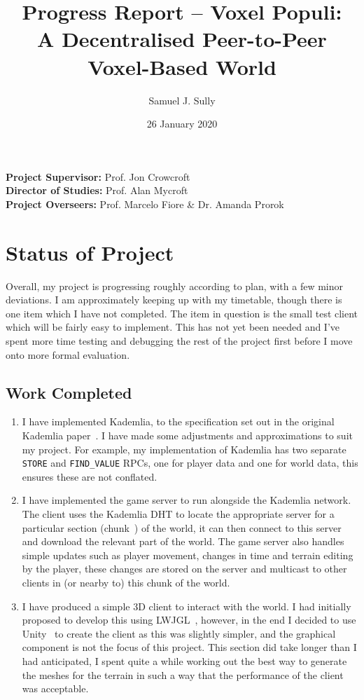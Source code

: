 \documentclass[11pt,a4paper]{article}
\begin{document}
	\title{Progress Report -- Voxel Populi:\\ A Decentralised Peer-to-Peer Voxel-Based World}
	\author{Samuel J. Sully}
	\date{26 January 2020}
	\maketitle
	\thispagestyle{empty}
	
	\noindent
	\textbf{Project Supervisor:} Prof. Jon Crowcroft\\
	\textbf{Director of Studies:} Prof. Alan Mycroft\\
	\textbf{Project Overseers:} Prof. Marcelo Fiore \&  Dr. Amanda Prorok

	\section{Status of Project}
	Overall, my project is progressing roughly according to plan, with a few minor deviations. I am approximately keeping up with my timetable, though there is one item which I have not completed. The item in question is the small test client which will be fairly easy to implement. This has not yet been needed and I've spent more time testing and debugging the rest of the project first before I move onto more formal evaluation.
	
	\subsection{Work Completed}
	\begin{enumerate}
		\item I have implemented Kademlia, to the specification set out in the original Kademlia paper~\cite{kademlia}. I have made some adjustments and approximations to suit my project. For example, my implementation of Kademlia has two separate \texttt{STORE} and \texttt{FIND\_VALUE} RPCs, one for player data and one for world data, this ensures these are not conflated.
		\item I have implemented the game server to run alongside the Kademlia network. The client uses the Kademlia DHT to locate the appropriate server for a particular section (chunk~\cite{chunk}) of the world, it can then connect to this server and download the relevant part of the world. The game server also handles simple updates such as player movement, changes in time and terrain editing by the player, these changes are stored on the server and multicast to other clients in (or nearby to) this chunk of the world.
		\item I have produced a simple 3D client to interact with the world. I had initially proposed to develop this using LWJGL~\cite{lwjgl}, however, in the end I decided to use Unity~\cite{unity} to create the client as this was slightly simpler, and the graphical component is not the focus of this project. This section did take longer than I had anticipated, I spent quite a while working out the best way to generate the meshes for the terrain in such a way that the performance of the client was acceptable.
	\end{enumerate}
\end{document}
